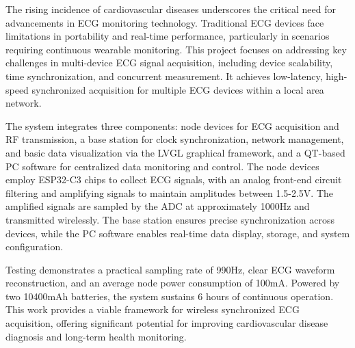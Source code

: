 {}

\begin{abstracten}
    The rising incidence of cardiovascular diseases underscores the critical need for advancements in ECG monitoring technology. Traditional ECG devices face limitations in portability and real-time performance, particularly in scenarios requiring continuous wearable monitoring. This project focuses on addressing key challenges in multi-device ECG signal acquisition, including device scalability, time synchronization, and concurrent measurement. It achieves low-latency, high-speed synchronized acquisition for multiple ECG devices within a local area network.  

    The system integrates three components: node devices for ECG acquisition and RF transmission, a base station for clock synchronization, network management, and basic data visualization via the LVGL graphical framework, and a QT-based PC software for centralized data monitoring and control. The node devices employ ESP32-C3 chips to collect ECG signals, with an analog front-end circuit filtering and amplifying signals to maintain amplitudes between 1.5-2.5V. The amplified signals are sampled by the ADC at approximately 1000Hz and transmitted wirelessly. The base station ensures precise synchronization across devices, while the PC software enables real-time data display, storage, and system configuration.  
    
    Testing demonstrates a practical sampling rate of 990Hz, clear ECG waveform reconstruction, and an average node power consumption of 100mA. Powered by two 10400mAh batteries, the system sustains 6 hours of continuous operation. This work provides a viable framework for wireless synchronized ECG acquisition, offering significant potential for improving cardiovascular disease diagnosis and long-term health monitoring.
\end{abstracten}